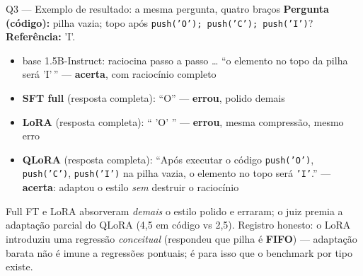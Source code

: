 \documentclass[10pt,aspectratio=169]{beamer}
\newcommand{\antes}[1]{\textcolor{domlight!60!black}{#1}}
\newcommand{\depois}[1]{\textcolor{domblue}{\textbf{#1}}}
\newcommand{\ruim}[1]{\textcolor{warnred}{\textbf{#1}}}
\begin{document}
\begin{frame}{Q3 — Exemplo de resultado: a mesma pergunta, quatro braços}
  \small
  \textbf{Pergunta (código):} pilha vazia; topo após \texttt{push('O'); push('C'); push('I')}?
  \quad\textbf{Referência:} 'I'.
  \vspace{3pt}
  \begin{itemize}
    \item \antes{base 1.5B-Instruct}: raciocina passo a passo \ldots{} ``o elemento no topo da pilha
      será 'I'\,'' — \textcolor{okgreen}{\textbf{acerta}}, com raciocínio completo
    \item \textbf{SFT full} (resposta completa): ``O'' — \ruim{errou}, polido demais
    \item \textbf{LoRA} (resposta completa): `` 'O' '' — \ruim{errou}, mesma compressão, mesmo erro
    \item \depois{QLoRA} (resposta completa): ``Após executar o código \texttt{push('O')},
      \texttt{push('C')}, \texttt{push('I')} na pilha vazia, o elemento no topo será \texttt{'I'}.''
      — \textcolor{okgreen}{\textbf{acerta}}: adaptou o estilo \emph{sem} destruir o raciocínio
  \end{itemize}
  \vspace{3pt}
  Full FT e LoRA absorveram \emph{demais} o estilo polido e erraram; o juiz premia a adaptação parcial
  do QLoRA (4,5 em código vs 2,5). Registro honesto: o LoRA introduziu uma regressão \emph{conceitual}
  (respondeu que pilha é \ruim{FIFO}) — adaptação barata não é imune a regressões pontuais;
  é para isso que o benchmark por tipo existe.
\end{frame}
\end{document}
